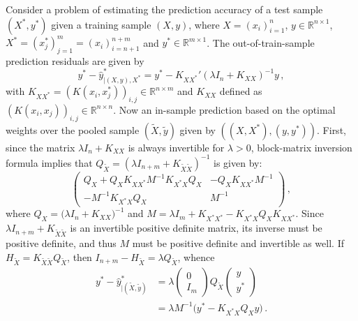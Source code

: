 \documentclass[a4paper,14pt]{extarticle}
\newcommand{\Real}{\mathbb{R}}
\begin{document}
Consider a problem of estimating the prediction accuracy of a test sample $(X^*, y^*)$
given a training sample $(X, y)$, where $X = (x_i)_{i=1}^n$, $y\in \Real^{n\times 1}$,
$X^* = (x^*_j)_{j=1}^m = (x_i)_{i=n+1}^{n+m}$ and $y^*\in \Real^{m\times 1}$. 
The out-of-train-sample prediction residuals are given by
\begin{equation*}
  y^* - \hat{y}^*_{|(X, y), X^*}
    = y^* - K_{XX^*}' (\lambda I_n + K_{XX})^{-1} y
    \,,
\end{equation*}
with $K_{XX^*} = (K(x_i, x^*_j))_{i,j} \in \Real^{n\times m}$ and $K_{XX}$ defined as
$(K(x_i, x_j))_{i,j} \in \Real^{n\times n}$. Now an in-sample prediction based on the
optimal weights over the pooled sample $(\tilde{X}, \tilde{y})$ given by $((X, X^*),
(y, y^*))$. First, since the matrix $\lambda I_n + K_{XX}$ is always invertible for
$\lambda > 0$, block-matrix inversion formula implies that $Q_{\tilde{X}} =
(\lambda I_{n+m} + K_{\tilde{X}\tilde{X}})^{-1}$ is given by:
\begin{equation*}
  \begin{pmatrix}
    Q_X + Q_X K_{XX^*} M^{-1} K_{X^*X} Q_X & - Q_X K_{XX^*} M^{-1} \\
    - M^{-1} K_{X^*X} Q_X & M^{-1}
  \end{pmatrix}
  \,,
\end{equation*}
where $Q_X = \bigl( \lambda I_n + K_{XX} \bigr)^{-1}$ and $M = \lambda I_m + K_{X^*X^*}
- K_{X^*X} Q_X K_{XX^*}$. Since $\lambda I_{n+m} + K_{\tilde{X}\tilde{X}}$ is an
invertible positive definite matrix, its inverse must be positive definite, and thus
$M$ must be positive definite and invertible as well.
If $H_{\tilde{X}} = K_{\tilde{X}\tilde{X}} Q_{\tilde{X}}$,
then $I_{n+m} - H_{\tilde{X}} = \lambda Q_{\tilde{X}}$, whence
\begin{align}
  y^* - \hat{y}^*_{|(\tilde{X}, \tilde{y})}
    &= \lambda \begin{pmatrix} 0\\ I_m \end{pmatrix} Q_{\tilde{X}}
        \begin{pmatrix} y\\ y^* \end{pmatrix} \nonumber \\
    &= \lambda M^{-1} \bigl( y^* - K_{X^*X} Q_X y \bigr) %
    \label{eq:holdout_resid}
    \,.
\end{align}
\end{document}
